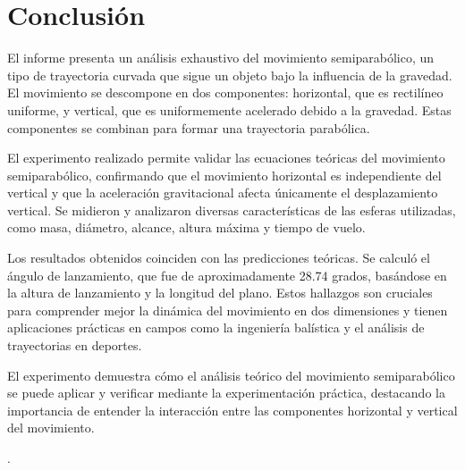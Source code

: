 \documentclass[a4paper,12pt]{article}
\begin{document}
\section{Conclusión}

El informe presenta un análisis exhaustivo del movimiento semiparabólico, un tipo de trayectoria curvada que sigue un objeto bajo la influencia de la gravedad. El movimiento se descompone en dos componentes: horizontal, que es rectilíneo uniforme, y vertical, que es uniformemente acelerado debido a la gravedad. Estas componentes se combinan para formar una trayectoria parabólica.

El experimento realizado permite validar las ecuaciones teóricas del movimiento semiparabólico, confirmando que el movimiento horizontal es independiente del vertical y que la aceleración gravitacional afecta únicamente el desplazamiento vertical. Se midieron y analizaron diversas características de las esferas utilizadas, como masa, diámetro, alcance, altura máxima y tiempo de vuelo.

Los resultados obtenidos coinciden con las predicciones teóricas. Se calculó el ángulo de lanzamiento, que fue de aproximadamente 28.74 grados, basándose en la altura de lanzamiento y la longitud del plano. Estos hallazgos son cruciales para comprender mejor la dinámica del movimiento en dos dimensiones y tienen aplicaciones prácticas en campos como la ingeniería balística y el análisis de trayectorias en deportes.

El experimento demuestra cómo el análisis teórico del movimiento semiparabólico se puede aplicar y verificar mediante la experimentación práctica, destacando la importancia de entender la interacción entre las componentes horizontal y vertical del movimiento.


\cite{becerra2010movimiento}.

\end{document}
